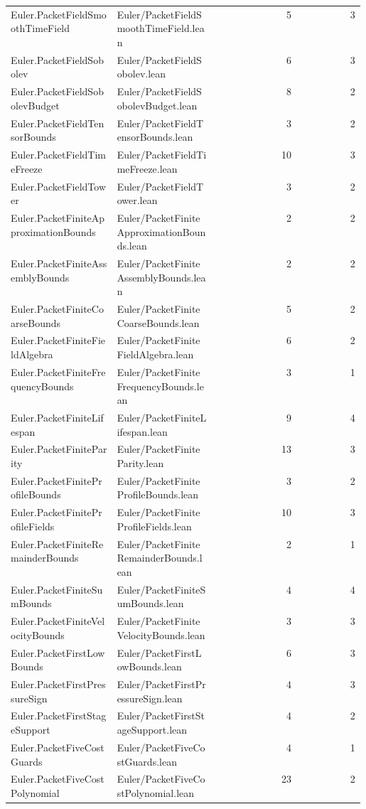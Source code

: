\begin{longtable}{p{0.30\linewidth}p{0.28\linewidth}rr}
Euler.PacketFieldSmoothTimeField & Euler/PacketFieldSmoothTimeField.lean & 5 & 3\\
Euler.PacketFieldSobolev & Euler/PacketFieldSobolev.lean & 6 & 3\\
Euler.PacketFieldSobolevBudget & Euler/PacketFieldSobolevBudget.lean & 8 & 2\\
Euler.PacketFieldTensorBounds & Euler/PacketFieldTensorBounds.lean & 3 & 2\\
Euler.PacketFieldTimeFreeze & Euler/PacketFieldTimeFreeze.lean & 10 & 3\\
Euler.PacketFieldTower & Euler/PacketFieldTower.lean & 3 & 2\\
Euler.PacketFiniteApproximationBounds & Euler/PacketFiniteApproximationBounds.lean & 2 & 2\\
Euler.PacketFiniteAssemblyBounds & Euler/PacketFiniteAssemblyBounds.lean & 2 & 2\\
Euler.PacketFiniteCoarseBounds & Euler/PacketFiniteCoarseBounds.lean & 5 & 2\\
Euler.PacketFiniteFieldAlgebra & Euler/PacketFiniteFieldAlgebra.lean & 6 & 2\\
Euler.PacketFiniteFrequencyBounds & Euler/PacketFiniteFrequencyBounds.lean & 3 & 1\\
Euler.PacketFiniteLifespan & Euler/PacketFiniteLifespan.lean & 9 & 4\\
Euler.PacketFiniteParity & Euler/PacketFiniteParity.lean & 13 & 3\\
Euler.PacketFiniteProfileBounds & Euler/PacketFiniteProfileBounds.lean & 3 & 2\\
Euler.PacketFiniteProfileFields & Euler/PacketFiniteProfileFields.lean & 10 & 3\\
Euler.PacketFiniteRemainderBounds & Euler/PacketFiniteRemainderBounds.lean & 2 & 1\\
Euler.PacketFiniteSumBounds & Euler/PacketFiniteSumBounds.lean & 4 & 4\\
Euler.PacketFiniteVelocityBounds & Euler/PacketFiniteVelocityBounds.lean & 3 & 3\\
Euler.PacketFirstLowBounds & Euler/PacketFirstLowBounds.lean & 6 & 3\\
Euler.PacketFirstPressureSign & Euler/PacketFirstPressureSign.lean & 4 & 3\\
Euler.PacketFirstStageSupport & Euler/PacketFirstStageSupport.lean & 4 & 2\\
Euler.PacketFiveCostGuards & Euler/PacketFiveCostGuards.lean & 4 & 1\\
Euler.PacketFiveCostPolynomial & Euler/PacketFiveCostPolynomial.lean & 23 & 2\\

\end{longtable}
